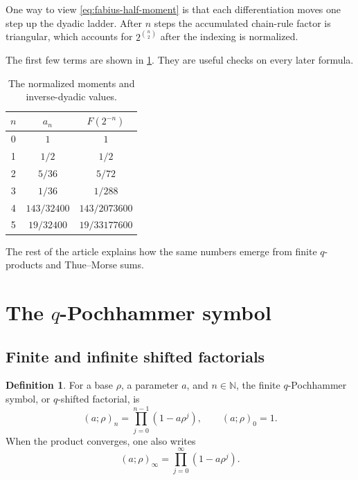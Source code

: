 \documentclass[11pt]{article}
\theoremstyle{definition}
\newtheorem{definition}[theorem]{Definition}
\newcommand{\N}{\mathbb{N}}
\newcommand{\Fabius}{F}
\newcommand{\qpoch}[3]{\left(#1;#2\right)_{#3}}
\begin{document}
One way to view \cref{eq:fabius-half-moment} is that each differentiation moves one step up the dyadic ladder.  After $n$ steps the accumulated chain-rule factor is triangular, which accounts for $2^{\binom{n}{2}}$ after the indexing is normalized.

The first few terms are shown in \cref{tab:first-values}.  They are useful checks on every later formula.

\begin{table}[ht]
\centering
\caption{The normalized moments and inverse-dyadic values.}
\label{tab:first-values}
\begin{tabular}{c@{\qquad}c@{\qquad}c}
\toprule
$n$ & $a_n$ & $\Fabius(2^{-n})$ \\
\midrule
0 & $1$ & $1$ \\
1 & $1/2$ & $1/2$ \\
2 & $5/36$ & $5/72$ \\
3 & $1/36$ & $1/288$ \\
4 & $143/32400$ & $143/2073600$ \\
5 & $19/32400$ & $19/33177600$ \\
\bottomrule
\end{tabular}
\end{table}

The rest of the article explains how the same numbers emerge from finite $q$-products and Thue--Morse sums.

\section{The \texorpdfstring{$q$}{q}-Pochhammer symbol}
\label{sec:q-pochhammer}

\subsection{Finite and infinite shifted factorials}

\begin{definition}
For a base $\rho$, a parameter $a$, and $n\in\N$, the finite $q$-Pochhammer symbol, or $q$-shifted factorial, is
\begin{equation}
  \qpoch{a}{\rho}{n}
  =\prod_{j=0}^{n-1}(1-a\rho^j),
  \qquad
  \qpoch{a}{\rho}{0}=1.
  \label{eq:q-pochhammer-definition}
\end{equation}
When the product converges, one also writes
\begin{equation}
  \qpoch{a}{\rho}{\infty}
  =\prod_{j=0}^{\infty}(1-a\rho^j).
  \label{eq:q-pochhammer-infinite}
\end{equation}
\end{definition}
\end{document}
